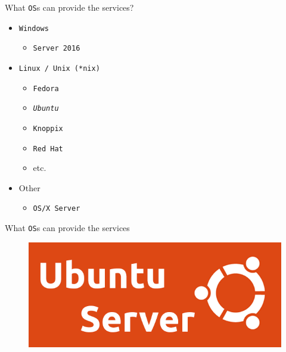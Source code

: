 \documentclass{beamer}
\begin{document}
\begin{frame}{What \texttt{OS}s can provide the services?}
  \begin{itemize}
    \item \texttt{Windows}
      \begin{itemize}
        \item \texttt{Server 2016}
      \end{itemize}
    \item \texttt{Linux / Unix (*nix)}
      \begin{itemize}
        \item \texttt{Fedora}
        \item \textit{\texttt{Ubuntu}}
        \item \texttt{Knoppix}
        \item \texttt{Red Hat}
        \item etc.
      \end{itemize}
    \item Other
      \begin{itemize}
        \item \texttt{OS/X Server}
      \end{itemize}
  \end{itemize}
\end{frame}

\begin{frame}{What \texttt{OS}s can provide the services}
  \begin{figure}
    \begin{center}
      \includegraphics[width=\linewidth]{UbuntuLogo.png}
    \end{center}
  \end{figure}
\end{frame}
\end{document}
